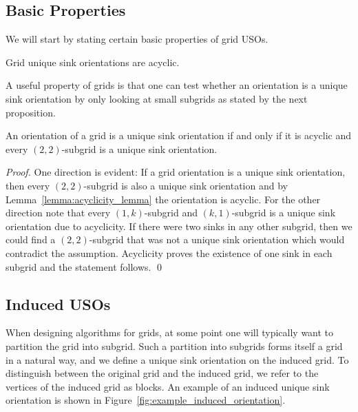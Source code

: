 \documentclass[runningheads,a4paper]{llncs}
\newcommand{\JN}[1]{\marginpar{\parbox{4cm}{{\small {\bf JN:} #1}}}} %
\begin{document}

\subsection{Basic Properties}

We will start by stating certain basic properties of grid USOs.

\begin{lemma}
\label{lemma:acyclicity_lemma}
 Grid unique sink orientations are acyclic.
\end{lemma}

A useful property of grids is that one can test whether an orientation is a unique sink orientation by only looking at small subgrids as stated by the next proposition.

\begin{proposition}
\label{prop:subgrid_uso_check}
 An orientation of a grid is a unique sink orientation if and only if it is acyclic and every $(2, 2)$-subgrid is a unique sink orientation.
\end{proposition}

\begin{proof}
 One direction is evident: If a grid orientation is a unique sink orientation, then every $(2,2)$-subgrid is also a unique sink orientation and by Lemma~\ref{lemma:acyclicity_lemma} the orientation is acyclic. 
 For the other direction note that every $(1,k)$-subgrid and $(k,1)$-subgrid is a unique sink orientation due to acyclicity. 
 If there were two sinks in any other subgrid, then we could find a $(2,2)$-subgrid that was not a unique sink orientation which would contradict the assumption.
 Acyclicity proves the existence of one sink in each subgrid and the statement follows. \qed
\end{proof}

\subsection{Induced USOs}

When designing algorithms for grids, at some point one will typically want to
partition the grid into subgrid.
Such a partition into subgrids forms itself a grid in a natural way,
and we define a unique sink orientation on the induced grid.
To distinguish between the original grid and the induced grid, we refer to the vertices of the induced grid as blocks.
An example of an induced unique sink orientation is shown in Figure~\ref{fig:example_induced_orientation}.
\end{document}
